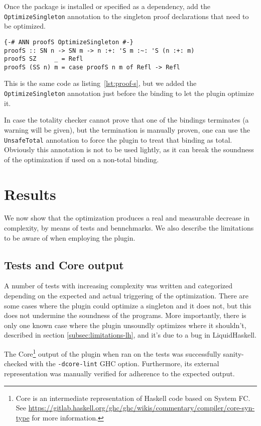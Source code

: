 Once the package is installed or specified as a dependency, add the \texttt{OptimizeSingleton} annotation to the singleton proof declarations that need to be optimized.

\begin{lstlisting}[caption=Optimizing \texttt{proofS}]
{-# ANN proofS OptimizeSingleton #-}
proofS :: SN n -> SN m -> n :+: 'S m :~: 'S (n :+: m)
proofS SZ     _ = Refl
proofS (SS n) m = case proofS n m of Refl -> Refl
\end{lstlisting}

This is the same code as listing~\ref{lst:proof-s}, but we added the \texttt{OptimizeSingleton} annotation just before the binding to let the plugin optimize it.

In case the totality checker cannot prove that one of the bindings terminates (a warning will be given), but the termination is manually proven, one can use the \texttt{UnsafeTotal} annotation to force the plugin to treat that binding as total.
Obviously this annotation is not to be used lightly, as it can break the soundness of the optimization if used on a non-total binding.

\chapter{Results}
\label{cha:results}

We now show that the optimization produces a real and measurable decrease in complexity, by means of tests and bennchmarks.
We also describe the limitations to be aware of when employing the plugin.

\section{Tests and Core output}
\label{sec:tests}

A number of tests with increasing complexity was written and categorized depending on the expected and actual triggering of the optimization.
There are some cases where the plugin could optimize a singleton and it does not, but this does not undermine the soundness of the programs.
More importantly, there is only one known case where the plugin unsoundly optimizes where it shouldn't, described in section \ref{subsec:limitations-lh}, and it's due to a bug in LiquidHaskell.

The Core\footnote{Core is an intermediate representation of Haskell code based on System FC. See \url{https://gitlab.haskell.org/ghc/ghc/wikis/commentary/compiler/core-syn-type} for more information.} output of the plugin when ran on the tests was successfully sanity-checked with the \texttt{-dcore-lint} GHC option.
Furthermore, its external representation\cite{core-external-representation} was manually verified for adherence to the expected output.

